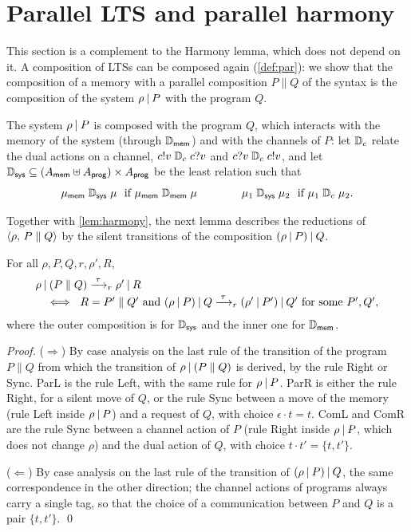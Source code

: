 \section{Parallel LTS and parallel harmony}\label{sec:par}

This section is a complement to the Harmony lemma, which does not depend on
it. A composition of LTSs can be composed again (\cref{def:par}): we show
that the composition of a memory with a parallel composition
$P \parallel Q$ of the syntax is the composition of the system
$\rho \mathbin{|} P$ with the program $Q$.

The system $\rho \mathbin{|} P$ is composed with the program
$Q$, which interacts with the memory of the system (through $\mathrel{\mathbb{D}_{\mathsf{mem}}}$) and
with the channels of $P$: let $\mathrel{\mathbb{D}_{c}}$ relate the dual actions on a channel,
$c!v \mathrel{\mathbb{D}_{c}} c?v$ and $c?v \mathrel{\mathbb{D}_{c}} c!v$, and let
${\mathrel{\mathbb{D}_{\mathsf{sys}}}} \subseteq (A_{\mathsf{mem}} \uplus A_{\mathsf{prog}}) \times A_{\mathsf{prog}}$
be the least relation such that
\[
\mu_{\mathsf{mem}} \mathrel{\mathbb{D}_{\mathsf{sys}}} \mu \ \text{ if } \mu_{\mathsf{mem}} \mathrel{\mathbb{D}_{\mathsf{mem}}} \mu
\qquad\qquad
\mu_1 \mathrel{\mathbb{D}_{\mathsf{sys}}} \mu_2 \ \text{ if } \mu_1 \mathrel{\mathbb{D}_{c}} \mu_2 .
\]

Together with \cref{lem:harmony}, the next lemma describes the reductions
of $\langle \rho ,\, P \parallel Q \rangle$ by the silent transitions of the composition
$(\rho \mathbin{|} P) \mathbin{|} Q$.

\begin{lemma}\label{lem:par-harmony}
For all $\rho, P, Q, r, \rho', R$,
\[
\begin{array}{l}
\rho \mathbin{|} (P \parallel Q) \xrightarrow{\;\tau\;}_{r} \rho' \mathbin{|} R\\[2pt]
\quad\iff\
R = P' \parallel Q' \text{ and }
(\rho \mathbin{|} P) \mathbin{|} Q \xrightarrow{\;\tau\;}_{r} (\rho' \mathbin{|} P') \mathbin{|} Q'
\text{ for some } P', Q',
\end{array}
\]
where the outer composition is for $\mathrel{\mathbb{D}_{\mathsf{sys}}}$ and the inner one for $\mathrel{\mathbb{D}_{\mathsf{mem}}}$.
\end{lemma}

\begin{proof}
($\Rightarrow$) By case analysis on the last rule of the transition of the
program $P \parallel Q$ from which the transition of
$\rho \mathbin{|} (P \parallel Q)$ is derived, by the rule Right or Sync. ParL is
the rule Left, with the same rule for $\rho \mathbin{|} P$. ParR is either the rule Right, for a silent move of
$Q$, or the rule Sync between a move of the memory (rule Left inside
$\rho \mathbin{|} P$) and a request of $Q$, with choice $\epsilon \cdot t = t$.
ComL and ComR are the rule Sync between a channel action of $P$ (rule
Right inside $\rho \mathbin{|} P$, which does not change $\rho$) and the dual action
of $Q$, with choice $t \cdot t' = \{t,t'\}$.

($\Leftarrow$) By case analysis on the last rule of the transition of
$(\rho \mathbin{|} P) \mathbin{|} Q$, the same correspondence in the other direction;
the channel actions of programs always carry a single tag, so that the choice
of a communication between $P$ and $Q$ is a pair $\{t,t'\}$.
\qed
\end{proof}

